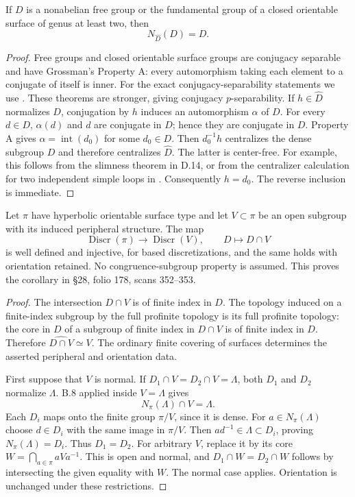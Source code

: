 If $D$ is a nonabelian free group or the fundamental group of a closed
orientable surface of genus at least two, then
\[
 N_{\widehat D}(D)=D.
\]

\begin{proof}
Free groups and closed orientable surface groups are conjugacy
separable and have Grossman's Property A: every automorphism taking
each element to a conjugate of itself is inner.  For the exact
conjugacy-separability statements we use
\citet[Theorems 3.2 and 4.1; Property A is stated in \S1 immediately
before Theorem 1.7]{Paris2009BC}.  These theorems are stronger, giving
conjugacy $p$-separability.  If $h\in\widehat D$ normalizes $D$,
conjugation by $h$ induces an automorphism $\alpha$ of $D$.  For every
$d\in D$, $\alpha(d)$ and $d$ are conjugate in $\widehat D$; hence
they are conjugate in $D$.  Property A gives
$\alpha=\operatorname{int}(d_0)$ for some $d_0\in D$.
Then $d_0^{-1}h$ centralizes the dense subgroup $D$ and therefore
centralizes $\widehat D$.  The latter is center-free.  For example,
this follows from the slimness theorem in D.14, or
from the centralizer calculation for two independent simple loops
in \citet[Proposition 3.6]{BoggiZalesskii2019BC}.
Consequently $h=d_0$.  The reverse inclusion is immediate.
\end{proof}

Let $\pi$ have hyperbolic orientable surface type and let
$V\subset\pi$ be an open subgroup with its induced peripheral
structure.  The map
\[
 \operatorname{Discr}(\pi)\longrightarrow\operatorname{Discr}(V),
 \qquad D\longmapsto D\cap V
\]
is well defined and injective, for based discretizations, and the
same holds with orientation retained.  No congruence-subgroup
property is assumed.  This proves the corollary in \S28, folio 178,
scans 352--353.

\begin{proof}
The intersection $D\cap V$ is of finite index in $D$.  The topology
induced on a finite-index subgroup by the full profinite topology is
its full profinite topology: the core in $D$ of a subgroup of finite
index in $D\cap V$ is of finite index in $D$.  Therefore
$\widehat{D\cap V}\simeq V$.  The ordinary finite covering of
surfaces determines the asserted peripheral and orientation data.

First suppose that $V$ is normal.  If
$D_1\cap V=D_2\cap V=\Lambda$, both $D_1$ and $D_2$ normalize
$\Lambda$.  B.8 applied inside $V=\widehat\Lambda$ gives
\[
 N_\pi(\Lambda)\cap V=\Lambda.
\]
Each $D_i$ maps onto the finite group $\pi/V$, since it is dense.
For $a\in N_\pi(\Lambda)$ choose $d\in D_i$ with the same image
in $\pi/V$.  Then $ad^{-1}\in\Lambda\subset D_i$, proving
$N_\pi(\Lambda)=D_i$.  Thus $D_1=D_2$.
For arbitrary $V$, replace it by its core
$W=\bigcap_{a\in\pi}aVa^{-1}$.  This is open and normal, and
$D_1\cap W=D_2\cap W$ follows by intersecting the given equality
with $W$.  The normal case applies.  Orientation is unchanged under
these restrictions.
\end{proof}

